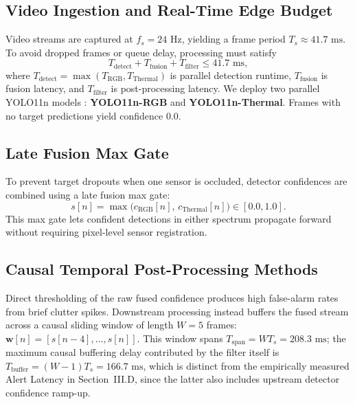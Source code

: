 \documentclass[conference]{IEEEtran}
\begin{document}
\subsection{Video Ingestion and Real-Time Edge Budget}
Video streams are captured at $f_s = 24\text{ Hz}$, yielding a frame period $T_s \approx 41.7\text{ ms}$. To avoid dropped frames or queue delay, processing must satisfy
\begin{equation}
T_{\text{detect}} + T_{\text{fusion}} + T_{\text{filter}} \le 41.7\text{ ms},
\label{eq:realtime_budget}
\end{equation}
where $T_{\text{detect}} = \max(T_{\text{RGB}}, T_{\text{Thermal}})$ is parallel detection runtime, $T_{\text{fusion}}$ is fusion latency, and $T_{\text{filter}}$ is post-processing latency. We deploy two parallel YOLO11n models \cite{jocher2024yolo11}: \textbf{YOLO11n-RGB} and \textbf{YOLO11n-Thermal}. Frames with no target predictions yield confidence 0.0.

\subsection{Late Fusion Max Gate}
To prevent target dropouts when one sensor is occluded, detector confidences are combined using a late fusion max gate:
\begin{equation}
s[n] = \max\big(c_{\text{RGB}}[n], \, c_{\text{Thermal}}[n]\big) \in [0.0, 1.0].
\label{eq:late_fusion}
\end{equation}
This max gate lets confident detections in either spectrum propagate forward without requiring pixel-level sensor registration.

\subsection{Causal Temporal Post-Processing Methods}
Direct thresholding of the raw fused confidence produces high false-alarm rates from brief clutter spikes. Downstream processing instead buffers the fused stream across a causal sliding window of length $W = 5$ frames: $\mathbf{w}[n] = [s[n-4], \dots, s[n]]$. This window spans $T_{\text{span}} = WT_s = 208.3\text{ ms}$; the maximum causal buffering delay contributed by the filter itself is $T_{\text{buffer}} = (W-1)T_s = 166.7\text{ ms}$, which is distinct from the empirically measured Alert Latency in Section~III.D, since the latter also includes upstream detector confidence ramp-up.
\end{document}
